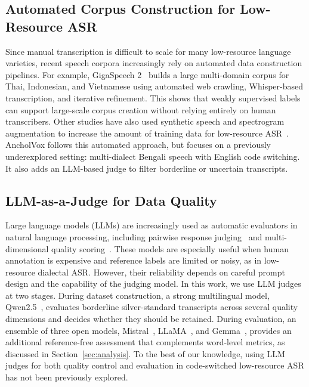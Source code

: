 \documentclass[journal]{IEEEtran}
\begin{document}
\subsection{Automated Corpus Construction for Low-Resource ASR}
Since manual transcription is difficult to scale for many low-resource language varieties, recent speech corpora increasingly rely on automated data construction pipelines. For example, GigaSpeech 2~\cite{yang2025gigaspeech2} builds a large multi-domain corpus for Thai, Indonesian, and Vietnamese using automated web crawling, Whisper-based transcription, and iterative refinement. This shows that weakly supervised labels can support large-scale corpus creation without relying entirely on human transcribers. Other studies have also used synthetic speech and spectrogram augmentation to increase the amount of training data for low-resource ASR~\cite{dhahbi2025endtoend}. AncholVox follows this automated approach, but focuses on a previously underexplored setting: multi-dialect Bengali speech with English code switching. It also adds an LLM-based judge to filter borderline or uncertain transcripts.

\subsection{LLM-as-a-Judge for Data Quality}
Large language models (LLMs) are increasingly used as automatic evaluators in natural language processing, including pairwise response judging~\cite{zheng2023judging,wang2023pandalm} and multi-dimensional quality scoring~\cite{fu2023gptscore}. These models are especially useful when human annotation is expensive and reference labels are limited or noisy, as in low-resource dialectal ASR. However, their reliability depends on careful prompt design and the capability of the judging model. In this work, we use LLM judges at two stages. During dataset construction, a strong multilingual model, Qwen2.5~\cite{qwen2025}, evaluates borderline silver-standard transcripts across several quality dimensions and decides whether they should be retained. During evaluation, an ensemble of three open models, Mistral~\cite{jiang2023mistral}, LLaMA~\cite{dubey2024llama}, and Gemma~\cite{gemmateam2025gemma3technicalreport}, provides an additional reference-free assessment that complements word-level metrics, as discussed in Section~\ref{sec:analysis}. To the best of our knowledge, using LLM judges for both quality control and evaluation in code-switched low-resource ASR has not been previously explored.
\end{document}
